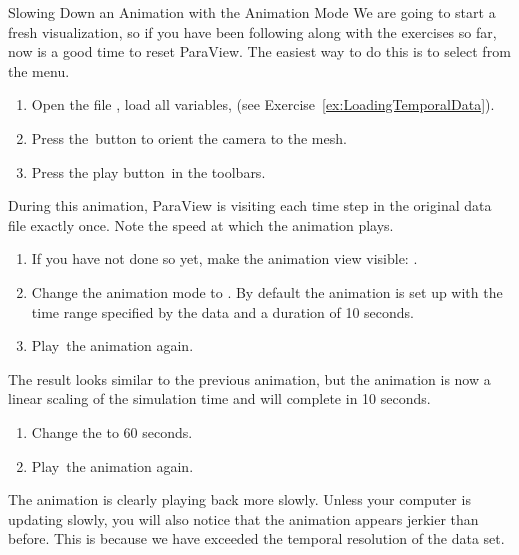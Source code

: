 \begin{exercise}{Slowing Down an Animation with the Animation Mode}%
  \label{ex:SlowingDownAnAnimation}%
  We are going to start a fresh visualization, so if you have been
  following along with the exercises so far, now is a good time to reset
  ParaView.  The easiest way to do this is to select  \ra
   from the menu.

  \begin{enumerate}
  \item Open the file , load all variables, \apply (see
    Exercise~\ref{ex:LoadingTemporalData}).
  \item Press the~\yPlus button to orient the camera to the mesh.
  \item Press the play button~\vcrPlay in the toolbars.
    \savecounter
  \end{enumerate}

  During this animation, ParaView is visiting each time step in the
  original data file exactly once.  Note the speed at which the animation
  plays.

  \begin{enumerate}
    \restorecounter
  \item If you have not done so yet, make the animation view visible:
     \ra {}.
  \item Change the animation mode to .  By default the
    animation is set up with the time range specified by the data and a
    duration of 10 seconds.
  \item Play~\vcrPlay the animation again.
    \savecounter
  \end{enumerate}

  The result looks similar to the previous 
  animation, but the animation is now a linear scaling of the simulation
  time and will complete in 10 seconds.

  \begin{enumerate}
    \restorecounter
  \item Change the  to 60 seconds.
  \item Play~\vcrPlay the animation again.
  \end{enumerate}

  The animation is clearly playing back more slowly.  Unless your computer
  is updating slowly, you will also notice that the animation appears
  jerkier than before.  This is because we have exceeded the temporal
  resolution of the data set.
\end{exercise}


